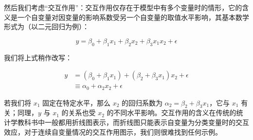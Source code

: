 \documentclass[
  b5paper,
  UTF8,twoside]{book}
\begin{document}
然后我们考虑``交互作用''：交互作用仅存在于模型中有多个变量时的情形，它的含义是一个自变量对因变量的影响系数受另一个自变量的取值水平影响，其基本数学形式为（以二元回归为例）：

\[y=\beta_{0}+\beta_{1}x_{1}+\beta_{2}x_{2}+\beta_{3}x_{1}x_{2}+\epsilon\]

我们将上式稍作改写：

\begin{align}
y   &=  (\beta_{0}+\beta_{1}x_{1})+(\beta_{2}+\beta_{3}x_{1})x_{2}+\epsilon \\
    &\equiv \alpha_{0}+\alpha_{2}x_{2}+\epsilon
\end{align}

若我们将 \(x_{1}\) 固定在特定水平，那么 \(x_{2}\) 的回归系数为 \(\alpha_{2}=\beta_{2}+\beta_{3}x_{1}\)，它与 \(x_{1}\) 有关；同理，\(y\) 与 \(x_{1}\) 的关系也受 \(x_{2}\) 的不同水平影响。交互作用的含义在传统的统计学教科书中一般都用折线图表示，而折线图只能表示自变量为分类变量时的交互效应，对于连续自变量情况的交互作用图示，我们则很难找到任何示例。
\end{document}
